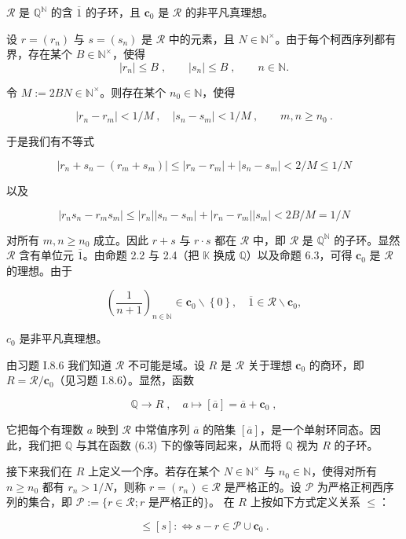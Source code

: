 \begin{lemma}

$ \mathcal{R} $ 是  $ \mathbb{Q}^{\mathbb{N}} $ 的含  $ \overline{1} $ 的子环，且  $ \mathbf{c}_0 $ 是  $ \mathcal{R} $ 的非平凡真理想。

\proofhead
设  $ r = (r_n) $ 与  $ s = (s_n) $ 是  $ \mathcal{R} $ 中的元素，且  $ N \in \mathbb{N}^\times $。由于每个柯西序列都有界，存在某个  $ B \in \mathbb{N}^\times $，使得
\[
|r_{n}|\leq B\;,\qquad|s_{n}|\leq B\;,\qquad n\in\mathbb{N}.
\]

令  $ M := 2BN \in \mathbb{N}^\times $。则存在某个  $ n_0 \in \mathbb{N} $，使得

\[
|r_{n}-r_{m}|<1/M~,\quad|s_{n}-s_{m}|<1/M~,\qquad m,n\geq n_{0}~.
\]

于是我们有不等式

\[
|r_{n}+s_{n}-\left(r_{m}+s_{m}\right)|\leq|r_{n}-r_{m}|+|s_{n}-s_{m}|<2/M\leq1/N
\]

以及

\[
|r_{n}s_{n}-r_{m}s_{m}|\leq|r_{n}||s_{n}-s_{m}|+|r_{n}-r_{m}||s_{m}|<2B/M=1/N
\]

对所有  $ m, n \geq n_0 $ 成立。因此  $ r + s $ 与  $ r \cdot s $ 都在  $ \mathcal{R} $ 中，即  $ \mathcal{R} $ 是  $ \mathbb{Q}^{\mathbb{N}} $ 的子环。显然  $ \mathcal{R} $ 含有单位元  $ \overline{1} $。由命题 2.2 与 2.4（把  $ \mathbb{K} $ 换成  $ \mathbb{Q} $）以及命题 6.3，可得  $ \mathbf{c}_0 $ 是  $ \mathcal{R} $ 的理想。由于

\[
\left(\frac{1}{n+1}\right)_{n\in\mathbb{N}}\in\mathbf{c}_{0}\backslash\left\{0\right\},\quad\overline{1}\in\mathcal{R}\backslash\mathbf{c}_{0},
\]

$c_0$ 是非平凡真理想。

由习题 I.8.6 我们知道  $ \mathcal{R} $ 不可能是域。设  $ R $ 是  $ \mathcal{R} $ 关于理想  $ \mathbf{c}_0 $ 的商环，即  $ R = \mathcal{R} / \mathbf{c}_0 $（见习题 I.8.6）。显然，函数

\begin{equation}
\mathbb{Q}\to R\;,\quad a\mapsto[\overline{{a}}]=\overline{{a}}+\mathbf{c}_{0}\;,
\end{equation}

它把每个有理数 $a$ 映到  $ \mathcal{R} $ 中常值序列 $\overline{a}$ 的陪集 $[\overline{a}]$，是一个单射环同态。因此，我们把 $\mathbb{Q}$ 与其在函数 (6.3) 下的像等同起来，从而将 $\mathbb{Q}$ 视为 $R$ 的子环。

接下来我们在 $R$ 上定义一个序。若存在某个 $N \in \mathbb{N}^\times$ 与 $n_0 \in \mathbb{N}$，使得对所有 $n \geq n_0$ 都有 $r_n > 1/N$，则称 $r = (r_n) \in \mathcal{R}$ 是严格正的。设 $\mathcal{P}$ 为严格正柯西序列的集合，即 $\mathcal{P} := \{r \in \mathcal{R} ; r\text{ 是严格正的}\}$。 在 $R$ 上按如下方式定义关系 $\leq$：

\begin{equation}
[r]\leq[s]:\Longleftrightarrow s-r\in\mathcal{P}\cup\mathbf{c}_{0}~.
\end{equation}
\end{lemma}

